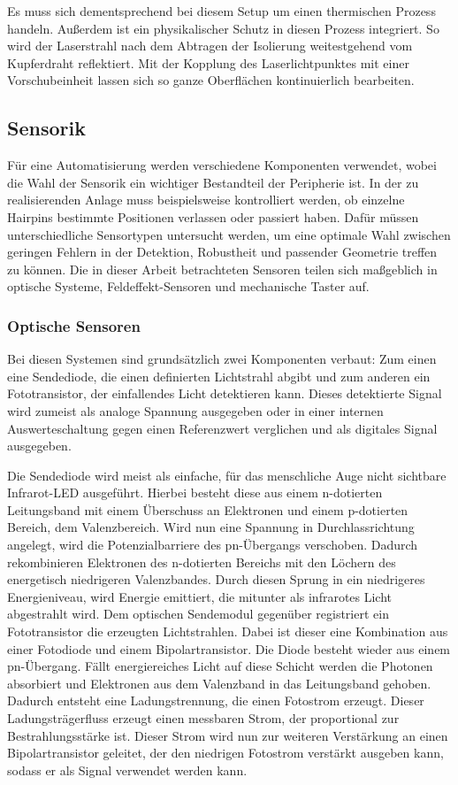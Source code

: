 Es muss sich dementsprechend
bei diesem Setup um einen thermischen Prozess handeln. Außerdem ist ein physikalischer Schutz in diesen Prozess integriert. So wird der Laserstrahl
nach dem Abtragen der Isolierung weitestgehend vom Kupferdraht reflektiert. Mit der Kopplung des Laserlichtpunktes mit einer Vorschubeinheit
lassen sich so ganze Oberflächen kontinuierlich bearbeiten.
%
%
\subsection{Sensorik}\label{sec:Sensoren}
%
Für eine Automatisierung werden verschiedene Komponenten verwendet, wobei die Wahl der Sensorik ein wichtiger Bestandteil der
Peripherie ist. In der zu realisierenden Anlage muss beispielsweise kontrolliert werden, ob einzelne Hairpins bestimmte
Positionen verlassen oder passiert haben. Dafür müssen unterschiedliche Sensortypen untersucht werden, um eine optimale Wahl zwischen
geringen Fehlern in der Detektion, Robustheit und passender Geometrie treffen zu können.
Die in dieser Arbeit betrachteten Sensoren teilen sich maßgeblich in optische Systeme, Feldeffekt-Sensoren und mechanische
Taster auf.
%
%
\subsubsection{Optische Sensoren}\label{sec:OptischeSensoren}
Bei diesen Systemen sind grundsätzlich zwei Komponenten verbaut: Zum einen eine Sendediode, die einen definierten Lichtstrahl
abgibt und zum anderen ein Fototransistor, der einfallendes Licht detektieren kann.
Dieses detektierte Signal wird zumeist als analoge Spannung ausgegeben oder in einer internen Auswerteschaltung gegen einen
Referenzwert verglichen und als digitales Signal ausgegeben.

Die Sendediode wird meist als einfache, für das menschliche Auge nicht sichtbare Infrarot-LED ausgeführt.
Hierbei besteht diese aus einem n-dotierten Leitungsband mit einem Überschuss an Elektronen und einem p-dotierten
Bereich, dem Valenzbereich. Wird nun eine Spannung in Durchlassrichtung angelegt, wird die Potenzialbarriere
des pn-Übergangs verschoben. Dadurch rekombinieren Elektronen des n-dotierten Bereichs mit den Löchern
des energetisch niedrigeren Valenzbandes. Durch diesen Sprung in ein niedrigeres Energieniveau, wird Energie
emittiert, die mitunter als infrarotes Licht abgestrahlt wird.
Dem optischen Sendemodul gegenüber registriert ein Fototransistor die erzeugten Lichtstrahlen. Dabei ist
dieser eine Kombination aus einer Fotodiode und einem Bipolartransistor. Die Diode besteht wieder aus
einem pn-Übergang. Fällt energiereiches Licht auf diese Schicht werden die Photonen absorbiert und
Elektronen aus dem Valenzband in das Leitungsband gehoben. Dadurch entsteht eine Ladungstrennung, die einen
Fotostrom erzeugt. Dieser Ladungsträgerfluss erzeugt einen messbaren Strom, der proportional zur Bestrahlungsstärke
ist. Dieser Strom wird nun zur weiteren Verstärkung an einen Bipolartransistor geleitet, der den
niedrigen Fotostrom verstärkt ausgeben kann, sodass er als Signal verwendet werden kann.

